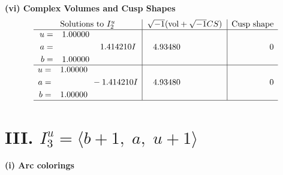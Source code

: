 \documentclass[1p]{elsarticle_modified}
\theoremstyle{definition}
\newcommand{\I}{\sqrt{-1}}
\begin{document}
\newpage\flushleft \textbf{(vi) Complex Volumes and Cusp Shapes}
$$\begin{array}{c|c|c}  
\text{Solutions to }I^u_{2}& \I (\text{vol} + \sqrt{-1}CS) & \text{Cusp shape}\\
 \hline 
\begin{aligned}
u &= \phantom{-}1.00000\phantom{ +0.000000I} \\
a &= \phantom{-0.000000 -}1.414210 I \\
b &= \phantom{-}1.00000\phantom{ +0.000000I}\end{aligned}
 & \phantom{-}4.93480\phantom{ +0.000000I} & \phantom{-0.000000 } 0 \\ \hline\begin{aligned}
u &= \phantom{-}1.00000\phantom{ +0.000000I} \\
a &= \phantom{-0.000000 } -1.414210 I \\
b &= \phantom{-}1.00000\phantom{ +0.000000I}\end{aligned}
 & \phantom{-}4.93480\phantom{ +0.000000I} & \phantom{-0.000000 } 0\\
 \hline 
 \end{array}$$\newpage\newpage\renewcommand{\arraystretch}{1}
\centering \section*{III. $I^u_{3}= \langle b+1,\;a,\;u+1 \rangle$}
\flushleft \textbf{(i) Arc colorings}\\
\end{document}
